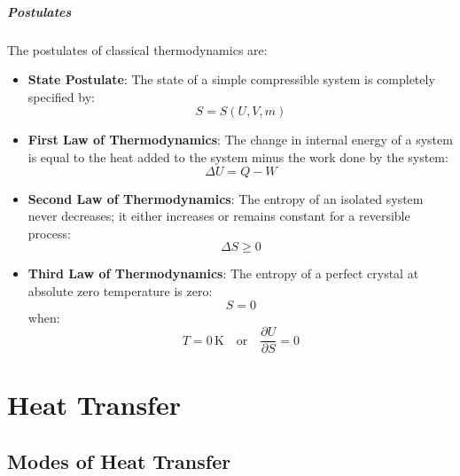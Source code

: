 \documentclass[11pt]{report}
\begin{document}
\paragraph{Postulates} The postulates of classical thermodynamics are:
\begin{itemize}
    \item \textbf{State Postulate}: The state of a simple compressible system is completely specified by:
    \begin{equation}
        S = S(U, V, m)
    \end{equation} 
    \item \textbf{First Law of Thermodynamics}: The change in internal energy of a system is equal to the heat added to the system minus the work done by the system:
    \begin{equation}
        \Delta U = Q - W
    \end{equation}
    \item \textbf{Second Law of Thermodynamics}: The entropy of an isolated system never decreases; it either increases or remains constant for a reversible process:
    \begin{equation}
        \Delta S \geq 0
    \end{equation}
    \item \textbf{Third Law of Thermodynamics}: The entropy of a perfect crystal at absolute zero temperature is zero:
    \begin{equation}
        S = 0
    \end{equation}
    when:
    \begin{equation}
        T = 0\, \text{K} \quad \text{or} \quad \frac{\partial U}{\partial S} = 0
    \end{equation}
\end{itemize}
    
\chapter{Heat Transfer}
\section{Modes of Heat Transfer}
\end{document}

